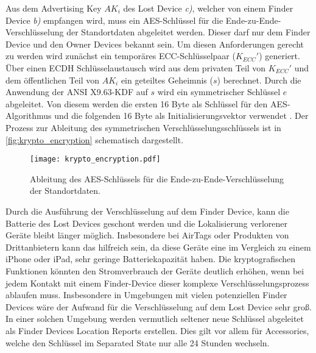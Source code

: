 Aus dem Advertising Key $AK_i$ des Lost Device \textit{c)}, welcher von einem Finder Device \textit{b)} empfangen wird, muss ein \ac{AES}-Schlüssel für die Ende-zu-Ende-Verschlüsselung der Standortdaten abgeleitet werden.
Dieser darf nur dem Finder Device und den Owner Devices bekannt sein.
Um diesen Anforderungen gerecht zu werden wird zunächst ein temporäres \ac{ECC}-Schlüsselpaar ($K_{ECC}'$) generiert.
Über einen \ac{ECDH} Schlüsselaustausch wird aus dem privaten Teil von $K_{ECC}'$ und dem öffentlichen Teil von $AK_i$ ein geteiltes Geheimnis ($s$) berechnet.
Durch die Anwendung der ANSI X9.63-\ac{KDF} auf $s$ wird ein symmetrischer Schlüssel $e$ abgeleitet.
Von diesem werden die ersten 16 Byte als Schlüssel für den \ac{AES}-Algorithmus und die folgenden 16 Byte als Initialisierungsvektor verwendet \cite{Heinrich_FindMy}.
Der Prozess zur Ableitung des symmetrischen Verschlüsselungsschlüssels ist in \autoref{fig:krypto_encryption} schematisch dargestellt.

\begin{figure}[ht]
    \centering
    \texttt{[image: krypto\_encryption.pdf]}
    \caption{Ableitung des \ac{AES}-Schlüssels für die Ende-zu-Ende-Verschlüsselung der Standortdaten.}
    \label{fig:krypto_encryption}
\end{figure}

Durch die Ausführung der Verschlüsselung auf dem Finder Device, kann die Batterie des Lost Devices geschont werden und die Lokalisierung verlorener Geräte bleibt länger möglich.
Insbesondere bei AirTags oder Produkten von Drittanbietern kann das hilfreich sein, da diese Geräte eine im Vergleich zu einem iPhone oder iPad, sehr geringe Batteriekapazität haben.
Die kryptografischen Funktionen könnten den Stromverbrauch der Geräte deutlich erhöhen, wenn bei jedem Kontakt mit einem Finder-Device dieser komplexe Verschlüsselungsprozess ablaufen muss.
Insbesondere in Umgebungen mit vielen potenziellen Finder Devices wäre der Aufwand für die Verschlüsselung auf dem Lost Device sehr groß.
In einer solchen Umgebung werden vermutlich seltener neue Schlüssel abgeleitet als Finder Devices Location Reports erstellen.
Dies gilt vor allem für Accessories, welche den Schlüssel im Separated State nur alle 24 Stunden wechseln.


